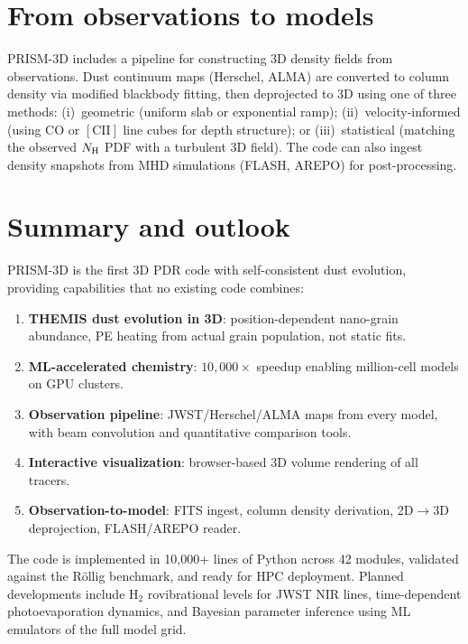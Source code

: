 \documentclass[twocolumn,letterpaper]{article}
\newcommand{\CII}{[\mathrm{CII}]}
\begin{document}
\section{From observations to models}
\label{sec:obs2model}

PRISM-3D includes a pipeline for constructing 3D density fields from observations.
Dust continuum maps (Herschel, ALMA) are converted to column density via modified
blackbody fitting, then deprojected to 3D using one of three methods: (i)~geometric
(uniform slab or exponential ramp); (ii)~velocity-informed (using CO or $\CII$ line
cubes for depth structure); or (iii)~statistical (matching the observed $N_{\rm H}$ PDF
with a turbulent 3D field). The code can also ingest density snapshots from MHD
simulations (FLASH, AREPO) for post-processing.


\section{Summary and outlook}
\label{sec:summary}

PRISM-3D is the first 3D PDR code with self-consistent dust evolution, providing
capabilities that no existing code combines:
\begin{enumerate}
\item \textbf{THEMIS dust evolution in 3D}: position-dependent nano-grain abundance,
  PE heating from actual grain population, not static fits.
\item \textbf{ML-accelerated chemistry}: $10{,}000\times$ speedup enabling
  million-cell models on GPU clusters.
\item \textbf{Observation pipeline}: JWST/Herschel/ALMA maps from every model,
  with beam convolution and quantitative comparison tools.
\item \textbf{Interactive visualization}: browser-based 3D volume rendering of
  all tracers.
\item \textbf{Observation-to-model}: FITS ingest, column density derivation,
  2D$\to$3D deprojection, FLASH/AREPO reader.
\end{enumerate}

The code is implemented in 10{,}000+ lines of Python across 42 modules,
validated against the R\"ollig benchmark, and ready for HPC deployment.
Planned developments include H$_2$ rovibrational levels for JWST NIR lines,
time-dependent photoevaporation dynamics, and Bayesian parameter inference
using ML emulators of the full model grid.
\end{document}
